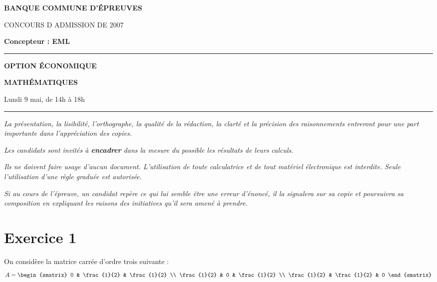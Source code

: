 \documentclass[11pt]{article}%
\begin{document}

\begin{center}
{\LARG\E\textbf{BANQUE COMMUNE D'ÉPREUVES}}



{\large \textsc{CONCOURS D ADMISSION DE 2007}}



{\large \textbf{Concepteur : EML}}



\rule{2.39cm}{0.05cm}



{\Large \textbf{OPTION ÉCONOMIQUE}}



{\Large \textbf{MATHÉMATIQUES }}



{\Large Lundi 9 mai, de 14h à 18h}



\rule{2.39cm}{0.05cm}
\end{center}

\textit{La présentation, la lisibilité, l'orthographe, la qualité
de la rédaction, la clarté et la précision des raisonnements
entreront pour une part importante dans l'appréciation des copies.}

\textit{Les candidats sont invités à \textbf{encadrer} dans la mesure
du possible les résultats de leurs calculs.}

\textit{Ils ne doivent faire usage d'aucun document. L'utilisation de
toute
calculatrice et de tout matériel électronique est interdite. Seule
l'utilisation d'une règle graduée est autorisée.}

\textit{Si au cours de l'épreuve, un candidat repère ce qui lui semble
être une erreur d'énoncé, il la signalera sur sa copie et
poursuivra sa composition en expliquant les raisons des initiatives
qu'il sera
amené à prendre.}

\vspace*{3cm}

\section*{Exercice 1}

On considère la matrice carrée d'ordre trois suivante :
\[
A = 
\begin{smatrix}
0 & \frac{1}{2} & \frac{1}{2} \\
\frac{1}{2} & 0 & \frac{1}{2} \\
\frac{1}{2} & \frac{1}{2} & 0
\end{smatrix}
\]
\end{document}
